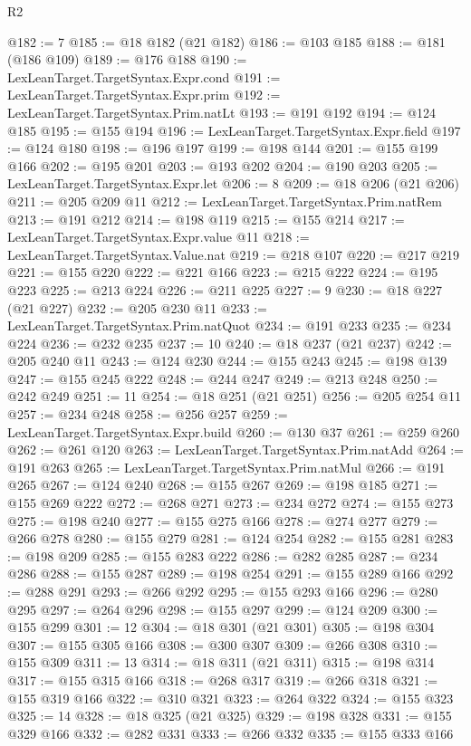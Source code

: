 \begin{lexlean}{R2}
\begin{coremodule}
@182 := 7
@185 := @18 @182 (@21 @182)
@186 := @103 @185
@188 := @181 (@186 @109)
@189 := @176 @188
@190 := LexLeanTarget.TargetSyntax.Expr.cond
@191 := LexLeanTarget.TargetSyntax.Expr.prim
@192 := LexLeanTarget.TargetSyntax.Prim.natLt
@193 := @191 @192
@194 := @124 @185
@195 := @155 @194
@196 := LexLeanTarget.TargetSyntax.Expr.field
@197 := @124 @180
@198 := @196 @197
@199 := @198 @144
@201 := @155 @199 @166
@202 := @195 @201
@203 := @193 @202
@204 := @190 @203
@205 := LexLeanTarget.TargetSyntax.Expr.let
@206 := 8
@209 := @18 @206 (@21 @206)
@211 := @205 @209 @11
@212 := LexLeanTarget.TargetSyntax.Prim.natRem
@213 := @191 @212
@214 := @198 @119
@215 := @155 @214
@217 := LexLeanTarget.TargetSyntax.Expr.value @11
@218 := LexLeanTarget.TargetSyntax.Value.nat
@219 := @218 @107
@220 := @217 @219
@221 := @155 @220
@222 := @221 @166
@223 := @215 @222
@224 := @195 @223
@225 := @213 @224
@226 := @211 @225
@227 := 9
@230 := @18 @227 (@21 @227)
@232 := @205 @230 @11
@233 := LexLeanTarget.TargetSyntax.Prim.natQuot
@234 := @191 @233
@235 := @234 @224
@236 := @232 @235
@237 := 10
@240 := @18 @237 (@21 @237)
@242 := @205 @240 @11
@243 := @124 @230
@244 := @155 @243
@245 := @198 @139
@247 := @155 @245 @222
@248 := @244 @247
@249 := @213 @248
@250 := @242 @249
@251 := 11
@254 := @18 @251 (@21 @251)
@256 := @205 @254 @11
@257 := @234 @248
@258 := @256 @257
@259 := LexLeanTarget.TargetSyntax.Expr.build
@260 := @130 @37
@261 := @259 @260
@262 := @261 @120
@263 := LexLeanTarget.TargetSyntax.Prim.natAdd
@264 := @191 @263
@265 := LexLeanTarget.TargetSyntax.Prim.natMul
@266 := @191 @265
@267 := @124 @240
@268 := @155 @267
@269 := @198 @185
@271 := @155 @269 @222
@272 := @268 @271
@273 := @234 @272
@274 := @155 @273
@275 := @198 @240
@277 := @155 @275 @166
@278 := @274 @277
@279 := @266 @278
@280 := @155 @279
@281 := @124 @254
@282 := @155 @281
@283 := @198 @209
@285 := @155 @283 @222
@286 := @282 @285
@287 := @234 @286
@288 := @155 @287
@289 := @198 @254
@291 := @155 @289 @166
@292 := @288 @291
@293 := @266 @292
@295 := @155 @293 @166
@296 := @280 @295
@297 := @264 @296
@298 := @155 @297
@299 := @124 @209
@300 := @155 @299
@301 := 12
@304 := @18 @301 (@21 @301)
@305 := @198 @304
@307 := @155 @305 @166
@308 := @300 @307
@309 := @266 @308
@310 := @155 @309
@311 := 13
@314 := @18 @311 (@21 @311)
@315 := @198 @314
@317 := @155 @315 @166
@318 := @268 @317
@319 := @266 @318
@321 := @155 @319 @166
@322 := @310 @321
@323 := @264 @322
@324 := @155 @323
@325 := 14
@328 := @18 @325 (@21 @325)
@329 := @198 @328
@331 := @155 @329 @166
@332 := @282 @331
@333 := @266 @332
@335 := @155 @333 @166

\end{coremodule}
\end{lexlean}
